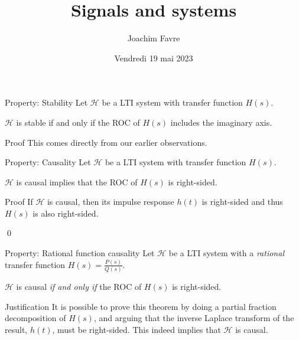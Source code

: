 \documentclass[a4paper]{article}
\title{Signals and systems}
\author{Joachim Favre}
\date{Vendredi 19 mai 2023}
\begin{document}
\maketitle


\begin{parag}{Property: Stability}
    Let $\mathcal{H}$ be a LTI system with transfer function $H\left(s\right)$.

    $\mathcal{H}$ is stable if and only if the ROC of $H\left(s\right)$ includes the imaginary axis.

    \begin{subparag}{Proof}
        This comes directly from our earlier observations.
    \end{subparag}
\end{parag}

\begin{parag}{Property: Causality}
    Let $\mathcal{H}$ be a LTI system with transfer function $H\left(s\right)$.

    $\mathcal{H}$ is causal implies that the ROC of $H\left(s\right)$ is right-sided.
    
    \begin{subparag}{Proof}
        If $\mathcal{H}$ is causal, then its impulse response $h\left(t\right)$ is right-sided and thus $H\left(s\right)$ is also right-sided.

        \qed
    \end{subparag}
\end{parag}

\begin{parag}{Property: Rational function causality}
    Let $\mathcal{H}$ be a LTI system with a \textit{rational} transfer function $H\left(s\right) = \frac{P\left(s\right)}{Q\left(s\right)}$.

    $\mathcal{H}$ is causal \textit{if and only if} the ROC of $H\left(s\right)$ is right-sided.

    \begin{subparag}{Justification}
        It is possible to prove this theorem by doing a partial fraction decomposition of $H\left(s\right)$, and arguing that the inverse Laplace transform of the result, $h\left(t\right)$, must be right-sided. This indeed implies that $\mathcal{H}$ is causal.
    \end{subparag}
\end{parag}
\end{document}
